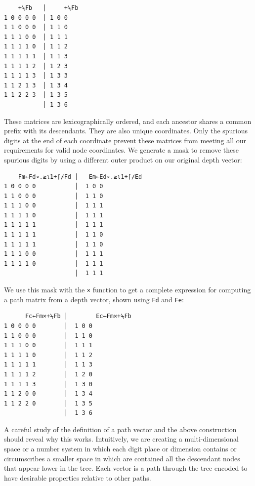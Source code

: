 ﻿\documentclass[numbers,10pt,preprint]{sigplanconf}
\begin{document}
\begin{verbatim}
    +⍀Fb   │     +⍀Fb
1 0 0 0 0  │ 1 0 0
1 1 0 0 0  │ 1 1 0
1 1 1 0 0  │ 1 1 1
1 1 1 1 0  │ 1 1 2
1 1 1 1 1  │ 1 1 3
1 1 1 1 2  │ 1 2 3
1 1 1 1 3  │ 1 3 3
1 1 2 1 3  │ 1 3 4
1 1 2 2 3  │ 1 3 5
           │ 1 3 6
\end{verbatim}

\noindent These matrices are lexicographically ordered, and each ancestor shares a common prefix with its descendants. They are also unique coordinates. Only the spurious digits at the end of each coordinate prevent these matrices from meeting all our requirements for valid node coordinates. We generate a mask to remove these spurious digits by using a different outer product on our original depth vector:

\begin{verbatim}
    Fm←Fd∘.≥⍳1+⌈⌿Fd │   Em←Ed∘.≥⍳1+⌈⌿Ed
1 0 0 0 0           │  1 0 0
1 1 0 0 0           │  1 1 0
1 1 1 0 0           │  1 1 1
1 1 1 1 0           │  1 1 1
1 1 1 1 1           │  1 1 1
1 1 1 1 1           │  1 1 0
1 1 1 1 1           │  1 1 0
1 1 1 0 0           │  1 1 1
1 1 1 1 0           │  1 1 1
                    │  1 1 1
\end{verbatim}

%

\noindent We use this mask with the \verb;×; function to get a complete expression for computing a path matrix from a depth vector, shown using \verb;Fd; and \verb;Fe;:

\begin{verbatim}
      Fc←Fm×+⍀Fb │        Ec←Fm×+⍀Fb
1 0 0 0 0        │  1 0 0
1 1 0 0 0        │  1 1 0
1 1 1 0 0        │  1 1 1
1 1 1 1 0        │  1 1 2
1 1 1 1 1        │  1 1 3
1 1 1 1 2        │  1 2 0
1 1 1 1 3        │  1 3 0
1 1 2 0 0        │  1 3 4
1 1 2 2 0        │  1 3 5
                 │  1 3 6
\end{verbatim}

A careful study of the definition of a path vector and the above construction should reveal why this works. Intuitively, we are creating a multi-dimensional space or a number system in which each digit place or dimension contains or circumscribes a smaller space in which are contained all the descendant nodes that appear lower in the tree. Each vector is a path through the tree encoded to have desirable properties relative to other paths.
\end{document}

